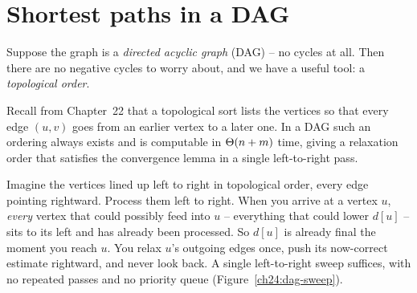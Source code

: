\section{Shortest paths in a DAG}

Suppose the graph
is a \emph{directed acyclic graph} (DAG) -- no cycles at all. Then there are no
negative cycles to worry about, and we have a useful
tool: a \emph{topological order}.

Recall from Chapter~22 that a topological sort lists the vertices so that every
edge $(u,v)$ goes from an earlier vertex to a later one. In a DAG such an ordering
always exists and is computable in $\Theta(n+m)$ time, giving a relaxation order that
satisfies the convergence lemma in a single left-to-right pass.

\begin{intuitionbox}
Imagine the vertices lined up left to right in topological order, every edge
pointing rightward. Process them left to right. When you arrive at a vertex $u$,
\emph{every} vertex that could possibly feed into $u$ -- everything that could
lower $d[u]$ -- sits to its left and has already been processed. So $d[u]$ is
already final the moment you reach $u$. You relax $u$'s outgoing edges once, push
its now-correct estimate rightward, and never look back. A single left-to-right
sweep suffices, with no repeated passes and no priority queue
(Figure~\ref{ch24:dag-sweep}).
\end{intuitionbox}

